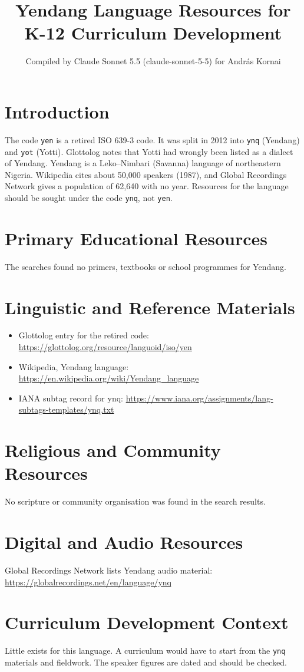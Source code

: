 \documentclass[12pt]{article}
\title{Yendang Language Resources for K-12 Curriculum Development}
\author{Compiled by Claude Sonnet 5.5 (claude-sonnet-5-5) for Andr\'as Kornai}
\date{}
\begin{document}
\maketitle

\section{Introduction}
The code \texttt{yen} is a retired ISO 639-3 code. It was split in 2012 into \texttt{ynq} (Yendang) and \texttt{yot} (Yotti). Glottolog notes that Yotti had wrongly been listed as a dialect of Yendang. Yendang is a Leko--Nimbari (Savanna) language of northeastern Nigeria. Wikipedia cites about 50,000 speakers (1987), and Global Recordings Network gives a population of 62,640 with no year. Resources for the language should be sought under the code \texttt{ynq}, not \texttt{yen}.

\section{Primary Educational Resources}
The searches found no primers, textbooks or school programmes for Yendang.

\section{Linguistic and Reference Materials}
\begin{itemize}
\item Glottolog entry for the retired code: \url{https://glottolog.org/resource/languoid/iso/yen}
\item Wikipedia, Yendang language: \url{https://en.wikipedia.org/wiki/Yendang_language}
\item IANA subtag record for ynq: \url{https://www.iana.org/assignments/lang-subtags-templates/ynq.txt}
\end{itemize}

\section{Religious and Community Resources}
No scripture or community organisation was found in the search results.

\section{Digital and Audio Resources}
Global Recordings Network lists Yendang audio material: \url{https://globalrecordings.net/en/language/ynq}

\section{Curriculum Development Context}
Little exists for this language. A curriculum would have to start from the \texttt{ynq} materials and fieldwork. The speaker figures are dated and should be checked.
\end{document}
